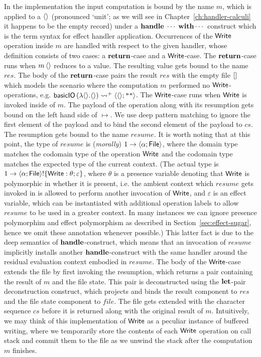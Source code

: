 \documentclass[12pt,phd,lfcs,twoside,openright,logo,leftchapter,normalheadings]{infthesis}
\theoremstyle{plain}
\theoremstyle{definition}
\begin{document}
In the implementation the input computation is bound by the name $m$,
which is applied to a $\langle  \rangle$ (pronounced `unit'; as we will see in
Chapter~\ref{ch:handler-calculi} it happens to be the empty record)
under a $\mathbf{handle}\;\cdots\;\mathbf{with}\cdots$ construct which is the term
syntax for effect handler application. Occurrences of the $\mathsf{Write}$
operation inside $m$ are handled with respect to the given handler, whose
definition consists of two cases: a $\mathbf{return}$-case and a
$\mathsf{Write}$-case.
%
The $\mathbf{return}$-case runs when $m\,\langle  \rangle$ reduces to a value. The
resulting value gets bound to the name $res$. The body of the
$\mathbf{return}$-case pairs the result $res$ with the empty file $[]$ which
models the scenario where the computation $m$ performed no
$\mathsf{Write}$-operations, e.g.
$\mathsf{basicIO}\,(\lambda\langle  \rangle.\langle  \rangle) \leadsto^+
\langle \langle  \rangle;\texttt{""} \rangle$.
%
The $\mathsf{Write}$-case runs when $\mathsf{Write}$ is invoked inside of $m$. The
payload of the operation along with its resumption gets bound on the
left hand side of $\mapsto$. We use deep pattern matching to ignore
the first element of the payload and to bind the second element of the
payload to $cs$. The resumption gets bound to the name $resume$. It is
worth noting that at this point, the type of $resume$ is
(\emph{morally}) $1 \to \langle \alpha;\mathsf{File} \rangle$, where the
domain type matches the codomain type of the operation $\mathsf{Write}$ and
the codomain type matches the expected type of the current context.
(The actual type is
$1 \to \langle \alpha;\mathsf{File} \rangle !
\{\mathsf{Write}:\theta;\varepsilon\}$, where $\theta$ is a presence variable
denoting that $\mathsf{Write}$ is polymorphic in whether it is present,
i.e. the ambient context which $resume$ gets invoked in is allowed to
perform another invocation of $\mathsf{Write}$, and $\varepsilon$ is an effect
variable, which can be instantiated with additional operation labels
to allow $resume$ to be used in a greater context. In many instances
we can ignore presence polymorphim and effect polymorphism as
described in Section~\ref{sec:effect-sugar}, hence we omit these
annotation whenever possible.) This latter fact is due to the deep
semantics of $\mathbf{handle}$-construct, which means that an invocation of
$resume$ implicitly installs another $\mathbf{handle}$-construct with the same
handler around the residual evaluation context embodied in $resume$.
%
The body of the $\mathsf{Write}$-case extends the file by first invoking the
resumption, which returns a pair containing the result of $m$ and the
file state. This pair is deconstructed using the $\mathbf{let}$-pair
deconstruction construct, which projects and binds the result
component to $res$ and the file state component to $file$. The file
gets extended with the character sequence $cs$ before it is returned
along with the original result of $m$.
%
Intuitively, we may think of this implementation of $\mathsf{Write}$ as a
peculiar instance of buffered writing, where we temporarily store the
contents of each $\mathsf{Write}$ operation on call stack and commit them to
the file as we unwind the stack after the computation $m$ finishes.
\end{document}
